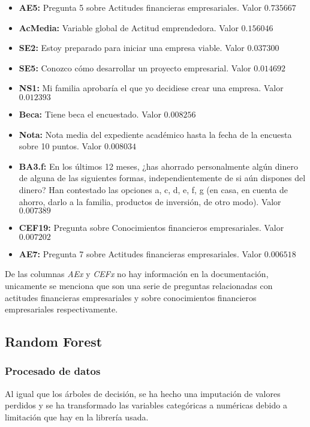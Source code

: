\begin{itemize}
	\item \textbf{AE5:} Pregunta 5 sobre Actitudes financieras empresariales. Valor $0.735667$
	\item \textbf{AcMedia:} Variable global de Actitud emprendedora. Valor $0.156046$
	\item \textbf{SE2:} Estoy preparado para iniciar una empresa viable. Valor $0.037300$
	\item \textbf{SE5:} Conozco cómo desarrollar un proyecto empresarial. Valor $0.014692$
	\item \textbf{NS1:} Mi familia aprobaría el que yo decidiese crear una empresa. Valor $0.012393$
	\item \textbf{Beca:} Tiene beca el encuestado. Valor $0.008256$
	\item \textbf{Nota:} Nota media del expediente académico hasta la fecha de la encuesta sobre 10 puntos. Valor $0.008034$
	\item \textbf{BA3.f:} En los últimos 12 meses, ¿has ahorrado personalmente algún dinero de alguna de las siguientes formas, independientemente de si aún dispones del dinero? Han contestado las opciones a, c, d, e, f, g (en casa, en cuenta de ahorro, darlo a la familia, productos de inversión, de otro modo). Valor $0.007389$
	\item \textbf{CEF19:} Pregunta sobre Conocimientos financieros empresariales. Valor $0.007202$
	\item \textbf{AE7:} Pregunta 7 sobre Actitudes financieras empresariales. Valor $0.006518$
\end{itemize}
De las columnas \textit{AEx} y \textit{CEFx} no hay información en la documentación, unicamente se menciona que son una serie de preguntas relacionadas con actitudes financieras empresariales y sobre conocimientos financieros empresariales respectivamente.
\subsection{Random Forest}

\subsubsection*{Procesado de datos}
Al igual que los árboles de decisión, se ha hecho una imputación de valores perdidos y se ha transformado las variables categóricas a numéricas debido a limitación que hay en la librería usada.
\pagebreak
